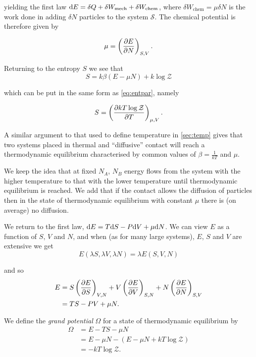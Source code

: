 \documentclass{notes}
\newcommand{\cS}{\mathcal{S}}
\newcommand{\cZ}{\mathcal{Z}}
\newcommand{\pdf}[3]{\left(\pd{#1}{#2}\right)_{#3}}
\begin{document}
yielding the first law $\mathrm{d} E = \delta Q + \delta W_{\text{mech}}
+ \delta W_{\text{chem}}$, where $\delta W_{\text{chem}} = \mu \delta N$
is the work done in adding $\delta N$ particles to the system $\cS$.
The chemical potential is therefore given by

\begin{equation}\label{eq:chempot}
\mu = \pdf{E}{N}{S,V}.
\end{equation}

Returning to the entropy $S$ we see that
\begin{equation}\label{eq:entZ}
S = k \beta ( E - \mu N ) + k \log \cZ
\end{equation}

which can be put in the same form as \eqref{eq:entpar}, namely

\begin{equation}\label{eq:gpfS}
S = \pdf{k T \log \cZ}{T}{\mu,V}.
\end{equation}

A similar argument to that used to define temperature in \ref{sec:temp}
gives that two systems placed in thermal and ``diffusive'' contact will
reach a thermodynamic equilibrium characterised by common values of
$\beta = \tfrac{1}{kT}$ and $\mu$.

We keep the idea that at fixed $N_A$, $N_B$ energy flows from the
system with the higher temperature to that with the lower temperature
until thermodynamic equilibrium is reached.  We add that if the contact
allows the diffusion of particles then in the state of thermodynamic
equilibrium with constant $\mu$ there is (on average) no diffusion.

We return to the first law, $\mathrm{d} E = T \mathrm{d} S - P \mathrm{d} V + \mu \mathrm{d} N$.
We can view $E$ as a function of $S$, $V$ and $N$, and when (as for
many large systems), $E$, $S$ and $V$ are extensive we get
\[
E(\lambda S, \lambda V, \lambda N) = \lambda E(S,V,N)
\]

and so
\begin{align*}
E &= S\pdf{E}{S}{V,N} + V\pdf{E}{V}{S,N} + N\pdf{E}{N}{S,V}\\
&= T S - P V + \mu N.
\end{align*}

We define the \emph{grand potential} $\Omega$ for a state of thermodynamic
equilibrium by
\begin{align*}
\Omega &= E - T S - \mu N \\
&= E - \mu N - (E - \mu N + k T \log \cZ) \\
&= - k T \log \cZ.
\end{align*}
\end{document}
